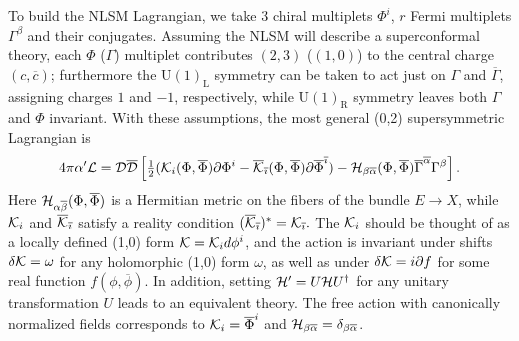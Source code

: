\documentclass[11pt, a4paper]{article}
\def\cDb{{\overline{\cD}}}
\def\GUL{\GU(1)_{\text{L}}}
\def\GUR{\GU(1)_{\text{R}}}
\def\GU{\operatorname{U{}}}
\def\p{\partial}
\def\ff#1#2{{\textstyle\frac{#1}{#2}}}
\def\cD{{\cal D}}
\def\cH{{\cal H}}
\def\cK{{\cal K}}
\def\cL{{\cal L}}
\newcommand\alphab{\overline{\alpha}}
\newcommand\betab{\overline{\beta}}
\newcommand\phib{\overline{\phi}}
\newcommand\Gammab{\overline{\Gamma}}
\newcommand\Phib{\overline{\Phi}}
\newcommand\cb{\overline{c}}
\newcommand\ib{\overline{\imath}}
\def\cDb{\overline{\cD}}
\def\cKb{\overline{\cK}}
\begin{document}
To build the NLSM Lagrangian, we take $3$ chiral multiplets $\Phi^i$, $r$ Fermi multiplets $\Gamma^\beta$ and their conjugates.  Assuming the NLSM will describe a superconformal theory, each $\Phi$ ($\Gamma$) multiplet contributes $(2,3)$ ($(1,0)$) to the central charge $(c,\cb)$; furthermore the $\GUL$ symmetry can be taken to act just on $\Gamma$ and $\Gammab$, assigning charges $1$ and $-1$, respectively, while $\GUR$ symmetry leaves both $\Gamma$ and $\Phi$ invariant.  With these assumptions, the most general (0,2) supersymmetric
Lagrangian is 
\begin{align}
\label{eq:Lgen}
4\pi \alpha' \cL = \cD \cDb \left[ \ff{1}{2} (\cK_i(\Phi,\Phib) \p \Phi^i - \cKb_{\ib}(\Phi,\Phib) \p \Phib^{\ib}) - \cH_{\beta\alphab}(\Phi,\Phib) \Gammab^{\alphab} \Gamma^\beta\right].
\end{align}
Here $\cH_{\alpha\betab}(\Phi,\Phib)$ is a Hermitian metric on the fibers of the bundle $E\to X$, while $\cK_i$ and $\cKb_{\ib}$ satisfy a reality condition $(\cKb_{\ib} )^\ast = \cK_{\ib}.$
The $\cK_i$ should be thought of as a locally defined (1,0) form $\cK = \cK_i d\phi^i$, and the action is invariant under shifts $\delta\cK = \omega$ for any holomorphic (1,0) form $\omega$, as well as under $\delta\cK = i \p f$ for some real function $f(\phi,\phib)$.  In
addition, setting $\cH' = U \cH U^\dag$ for any unitary transformation $U$ leads to an equivalent theory.
The free action with canonically normalized fields corresponds to $\cK_i = \Phib^i$ and $\cH_{\beta\alphab} = \delta_{\beta\alphab}$.
\end{document}
